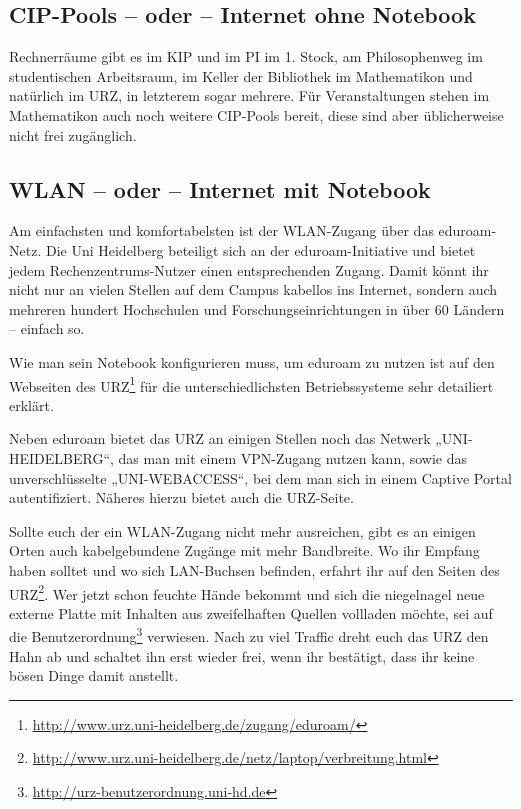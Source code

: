 \subsection*{CIP-Pools -- oder -- Internet ohne Notebook}
Rechnerräume gibt es im \gls{KIP} und im \gls{PI} im 1. Stock, am Philosophenweg im studentischen Arbeitsraum, im Keller der Bibliothek im \gls{Mathematikon} und natürlich im \gls{URZ}, in letzterem sogar mehrere. Für Veranstaltungen stehen im Mathematikon auch noch weitere CIP-Pools bereit, diese sind aber üblicherweise nicht frei zugänglich.

\subsection*{WLAN -- oder -- Internet mit Notebook}
Am einfachsten und komfortabelsten ist der WLAN-Zugang über das e\-du\-roam-Netz. Die Uni Heidelberg beteiligt sich an der eduroam-Initiative und bietet jedem Rechenzentrums-Nutzer einen entsprechenden Zugang. Damit könnt ihr nicht nur an vielen Stellen auf dem Campus kabellos ins Internet, sondern auch mehreren hundert Hochschulen und Forschungseinrichtungen in über 60 Ländern – einfach so.

Wie man sein Notebook konfigurieren muss, um eduroam zu nutzen ist auf den Webseiten des URZ\footnote{\url{http://www.urz.uni-heidelberg.de/zugang/eduroam/}} für die unterschiedlichsten Betriebssysteme sehr detailiert erklärt.

Neben eduroam bietet das URZ an einigen Stellen noch das Netwerk „UNI-HEIDELBERG“, das man mit einem VPN-Zugang nutzen kann, sowie das unverschlüsselte „UNI-WEBACCESS“, bei dem man sich in einem Captive Portal autentifiziert. Näheres hierzu bietet auch die URZ-Seite.%

Sollte euch der ein WLAN-Zugang nicht mehr ausreichen, gibt es an einigen Orten auch kabelgebundene Zugänge mit mehr Bandbreite. Wo ihr Empfang haben solltet und wo sich LAN-Buchsen befinden, erfahrt ihr auf den Seiten des \gls{URZ}\footnote{\url{http://www.urz.uni-heidelberg.de/netz/laptop/verbreitung.html}}. Wer jetzt schon feuchte Hände bekommt und sich die niegelnagel neue externe Platte mit Inhalten aus zweifelhaften Quellen vollladen möchte, sei auf die Benutzerordnung\footnote{\url{http://urz-benutzerordnung.uni-hd.de}} verwiesen. Nach zu viel Traffic dreht euch das \gls{URZ} den Hahn ab und schaltet ihn erst wieder frei, wenn ihr bestätigt, dass ihr keine bösen Dinge damit anstellt.

